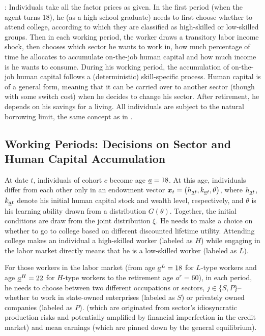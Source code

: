 \documentclass[12pt]{article}
\newcommand{\highlightR}[1]{{\color{MyRed}{#1}}}
\theoremstyle{definition}
\begin{document}
\begin{spacing}{1}
\highlightR{Overview of the Setup}:
Individuals take all the factor prices as given. In the first period (when the agent turns 18), he (as a high school graduate) needs to first choose whether to attend college, according to which they are classified as high-skilled or low-skilled groups. Then in each working period, the worker draws a transitory labor income shock, then chooses which sector he wants to work in, how much percentage of time he allocates to accumulate on-the-job human capital and how much income is he wants to consume. During his working period, the accumulation of on-the-job human capital follows a (deterministic) skill-specific process. Human capital is of a general form, meaning that it can be carried over to another sector (though with some switch cost) when he decides to change his sector. After retirement, he depends on his savings for a living. All individuals are subject to the natural borrowing limit, the same concept as in \citet{aiyagari1994}. 

\subsection{Working Periods: Decisions on Sector and Human Capital Accumulation}

At date $t$, individuals of cohort $c$ become age $\underline{a}=18$. At this age, individuals differ from each other only in an endowment vector $\boldsymbol{x}_t = \left(h_{\underline{a}t}, k_{\underline{a}t}, \theta\right)$, where $h_{\underline{a}t}$, $k_{\underline{a}t}$ denote his initial human capital stock and wealth level, respectively, and $\theta$ is his learning ability drawn from a distribution $G(\theta)$. Together, the initial conditions are draw from the joint distribution $\xi$. He needs to make a choice on whether to go to college based on different discounted lifetime utility. Attending college makes an individual a high-skilled worker (labeled as $H$) while engaging in the labor market directly means that he is a low-skilled worker (labeled as $L$). 

For those workers in the labor market (from age $\underline{a}^L = 18$ for $L$-type workers and age $\underline{a}^H = 22$ for $H$-type workers to the retirement age $a^{r} = 60$), in each period, he needs to choose between two different occupations or sectors, $j \in \{S, P\}$--whether to work in state-owned enterprises (labeled as $S$) or privately owned companies (labeled as $P$). \highlightR{From individuals' point of view, sectors differ from each other in the aspect of mean earnings and the idiosyncratic earning risks} (which are originated from sector's idiosyncratic production risks and potentially amplified by financial imperfection in the credit market) and mean earnings (which are pinned down by the general equilibrium). 


\end{spacing}
\end{document}
